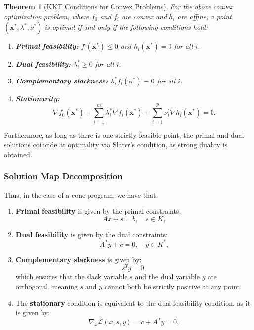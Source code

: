 \documentclass{article}
\newtheorem{theorem}{Theorem}
\begin{document}
\begin{theorem}[KKT Conditions for Convex Problems]
\label{thm:kkt}
For the above convex optimization problem, where $f_0$ and $f_i$ are convex and $h_i$ are affine, a point $(\mathbf{x}^*, \lambda^*, \nu^*)$ is optimal if and only if the following conditions hold:
\begin{enumerate}
    \item \textbf{Primal feasibility:} $f_i(\mathbf{x}^*) \leq 0$ and $h_i(\mathbf{x}^*) = 0$ for all $i$.
    \item \textbf{Dual feasibility:} $\lambda_i^* \geq 0$ for all $i$.
    \item \textbf{Complementary slackness:} $\lambda_i^* f_i(\mathbf{x}^*) = 0$ for all $i$.
    \item \textbf{Stationarity:}
    \[
    \nabla f_0(\mathbf{x}^*) + \sum_{i=1}^m \lambda_i^* \nabla f_i(\mathbf{x}^*) + \sum_{i=1}^p \nu_i^* \nabla h_i(\mathbf{x}^*) = 0.
    \]
\end{enumerate}
\end{theorem}

Furthermore, as long as there is one strictly feasible point, the primal and dual solutions coincide at optimality via Slater's condition, as strong duality is obtained.

\subsubsection{Solution Map Decomposition}

Thus, in the case of a cone program, we have that:

\begin{enumerate}
    \item \textbf{Primal feasibility} is given by the primal constraints:
    \[
    A x + s = b, \quad s \in K,
    \]

    \item \textbf{Dual feasibility} is given by the dual constraints:
    \[
    A^T y + c = 0, \quad y \in K^*,
    \]
    
    \item \textbf{Complementary slackness} is given by:
    \[
    s^T y = 0,
    \]
    which ensures that the slack variable \( s \) and the dual variable \( y \) are orthogonal, meaning \( s \) and \( y \) cannot both be strictly positive at any point.

    \item The \textbf{stationary} condition is equivalent to the dual feasibility condition, as it is given by:
    \[
    \nabla_x \mathcal{L}(x, s, y) = c + A^T y = 0,
    \]
\end{enumerate}
\end{document}
